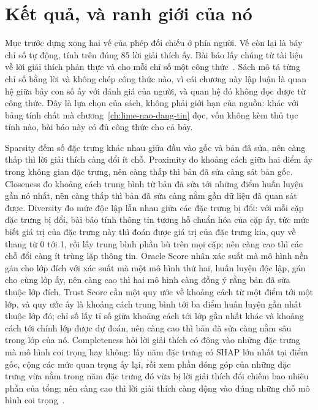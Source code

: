 \section{Kết quả, và ranh giới của nó}
\label{sec:ch12-ket-qua-va-ranh-gioi}

%
Mục trước dựng xong hai vế của phép đối chiếu ở phía người. Vế còn lại là bảy
chỉ số tự động, tính trên đúng 85 lời giải thích ấy. Bài báo lấy chúng từ tài
liệu về lời giải thích phản thực và cho mỗi chỉ số một công
thức~\autocite{p25userperception}. Sách mô tả từng chỉ số bằng lời và không
chép công thức nào, vì cái chương này lập luận là quan hệ giữa bảy con số ấy
với đánh giá của người, và quan hệ đó không đọc được từ công thức. Đây là lựa
chọn của sách, không phải giới hạn của nguồn: khác với bảng tính chất mà
chương~\ref{ch:lime-nao-dang-tin} đọc, vốn không kèm thủ tục tính nào, bài báo
này có đủ công thức cho cả bảy.

Sparsity đếm số đặc trưng khác nhau giữa đầu vào gốc và bản đã sửa, nên càng
thấp thì lời giải thích càng đổi ít chỗ. Proximity đo khoảng cách giữa hai
điểm ấy trong không gian đặc trưng, nên càng thấp thì bản đã sửa càng sát bản
gốc. Closeness đo khoảng cách trung bình từ bản đã sửa tới những điểm huấn
luyện gần nó nhất, nên càng thấp thì bản đã sửa càng nằm gần dữ liệu đã quan
sát được. Diversity đo mức độc lập lẫn nhau giữa các đặc trưng bị đổi: với mỗi
cặp đặc trưng bị đổi, bài báo tính thông tin tương hỗ chuẩn hóa của cặp ấy,
tức mức biết giá trị của đặc trưng này thì đoán được giá trị của đặc trưng kia,
quy về thang từ 0 tới 1, rồi lấy trung bình phần bù trên mọi cặp; nên càng cao
thì các chỗ đổi càng ít trùng lặp thông tin. Oracle Score nhân xác suất mà mô
hình nền gán cho lớp đích với xác suất mà một mô hình thứ hai, huấn luyện độc
lập, gán cho cùng lớp ấy, nên càng cao thì hai mô hình càng đồng ý rằng bản đã
sửa thuộc lớp đích. Trust Score cần một quy ước về khoảng cách từ một điểm tới
một lớp, và quy ước ấy là khoảng cách trung bình tới ba điểm huấn luyện gần
nhất thuộc lớp đó; chỉ số lấy tỉ số giữa khoảng cách tới lớp gần nhất khác và
khoảng cách tới chính lớp được dự đoán, nên càng cao thì bản đã sửa càng nằm
sâu trong lớp của nó. Completeness hỏi lời giải thích có động vào những đặc
trưng mà mô hình coi trọng hay không: lấy năm đặc trưng có  SHAP lớn nhất tại điểm gốc, cộng các mức quan trọng ấy lại,
rồi xem phần đóng góp của những đặc trưng vừa nằm trong năm đặc trưng đó vừa bị
lời giải thích đổi chiếm bao nhiêu phần của tổng; nên càng cao thì lời giải
thích càng động vào đúng những chỗ mô hình coi
trọng~\autocite{p25userperception}.

